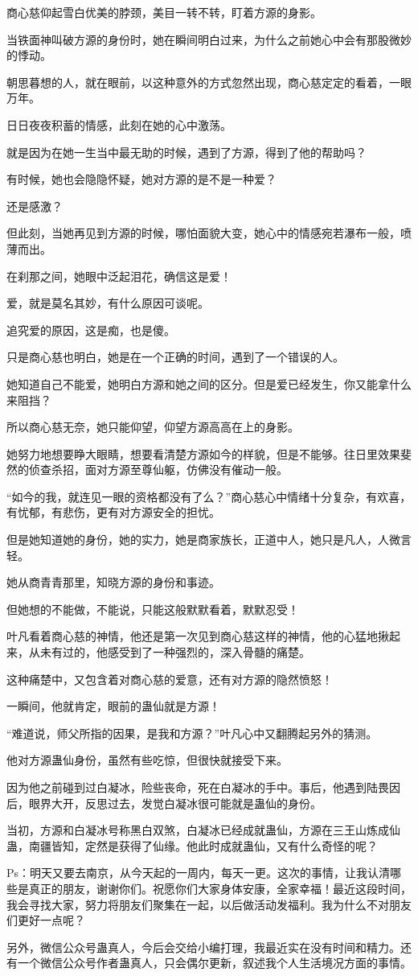 \begin{this_body}
商心慈仰起雪白优美的脖颈，美目一转不转，盯着方源的身影。

当铁面神叫破方源的身份时，她在瞬间明白过来，为什么之前她心中会有那股微妙的悸动。

朝思暮想的人，就在眼前，以这种意外的方式忽然出现，商心慈定定的看着，一眼万年。

日日夜夜积蓄的情感，此刻在她的心中激荡。

就是因为在她一生当中最无助的时候，遇到了方源，得到了他的帮助吗？

有时候，她也会隐隐怀疑，她对方源的是不是一种爱？

还是感激？

但此刻，当她再见到方源的时候，哪怕面貌大变，她心中的情感宛若瀑布一般，喷薄而出。

在刹那之间，她眼中泛起泪花，确信这是爱！

爱，就是莫名其妙，有什么原因可谈呢。

追究爱的原因，这是痴，也是傻。

只是商心慈也明白，她是在一个正确的时间，遇到了一个错误的人。

她知道自己不能爱，她明白方源和她之间的区分。但是爱已经发生，你又能拿什么来阻挡？

所以商心慈无奈，她只能仰望，仰望方源高高在上的身影。

她努力地想要睁大眼睛，想要看清楚方源如今的样貌，但是不能够。往日里效果斐然的侦查杀招，面对方源至尊仙躯，仿佛没有催动一般。

“如今的我，就连见一眼的资格都没有了么？”商心慈心中情绪十分复杂，有欢喜，有忧郁，有悲伤，更有对方源安全的担忧。

但是她知道她的身份，她的实力，她是商家族长，正道中人，她只是凡人，人微言轻。

她从商青青那里，知晓方源的身份和事迹。

但她想的不能做，不能说，只能这般默默看着，默默忍受！

叶凡看着商心慈的神情，他还是第一次见到商心慈这样的神情，他的心猛地揪起来，从未有过的，他感受到了一种强烈的，深入骨髓的痛楚。

这种痛楚中，又包含着对商心慈的爱意，还有对方源的隐然愤怒！

一瞬间，他就肯定，眼前的蛊仙就是方源！

“难道说，师父所指的因果，是我和方源？”叶凡心中又翻腾起另外的猜测。

他对方源蛊仙身份，虽然有些吃惊，但很快就接受下来。

因为他之前碰到过白凝冰，险些丧命，死在白凝冰的手中。事后，他遇到陆畏因后，眼界大开，反思过去，发觉白凝冰很可能就是蛊仙的身份。

当初，方源和白凝冰号称黑白双煞，白凝冰已经成就蛊仙，方源在三王山炼成仙蛊，南疆皆知，定然是获得了仙缘。他此时成就蛊仙，又有什么奇怪的呢？

Ps：明天又要去南京，从今天起的一周内，每天一更。这次的事情，让我认清哪些是真正的朋友，谢谢你们。祝愿你们大家身体安康，全家幸福！最近这段时间，我会寻找大家，努力将朋友们聚集在一起，以后做活动发福利。我为什么不对朋友们更好一点呢？

另外，微信公众号蛊真人，今后会交给小编打理，我最近实在没有时间和精力。还有一个微信公众号作者蛊真人，只会偶尔更新，叙述我个人生活境况方面的事情。

\end{this_body}

